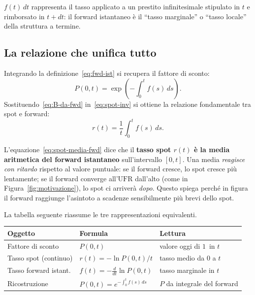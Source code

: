 \documentclass[11pt,a4paper]{article}
\theoremstyle{plain}
\theoremstyle{definition}
\theoremstyle{remark}
\newcommand{\UFR}{\ensuremath{\mathrm{UFR}}}
\begin{document}
$f(t)\,dt$ rappresenta il tasso applicato a un prestito infinitesimale stipulato in $t$
e rimborsato in $t+dt$: il forward istantaneo \`e il ``tasso marginale'' o ``tasso locale''
della struttura a termine.

\subsection{La relazione che unifica tutto}

Integrando la definizione~\eqref{eq:fwd-ist} si recupera il fattore di sconto:
\begin{equation}
  P(0,t) = \exp\!\left(-\int_0^t f(s)\,ds\right).
  \label{eq:B-da-fwd}
\end{equation}
Sostituendo~\eqref{eq:B-da-fwd} in~\eqref{eq:spot-inv} si ottiene la relazione
fondamentale tra spot e forward:
\begin{equation}
  r(t) = \frac{1}{t}\int_0^t f(s)\,ds.
  \label{eq:spot-media-fwd}
\end{equation}
\begin{keybox}
L'equazione~\eqref{eq:spot-media-fwd} dice che il \textbf{tasso spot $r(t)$ \`e la media
aritmetica del forward istantaneo} sull'intervallo $[0,t]$. Una media \emph{reagisce con
ritardo} rispetto al valore puntuale: se il forward cresce, lo spot cresce pi\`u lentamente;
se il forward converge all'$\UFR$ dall'alto (come in Figura~\ref{fig:motivazione}),
lo spot ci arriver\`a \emph{dopo}. Questo spiega perch\'e in figura il forward raggiunge
l'asintoto a scadenze sensibilmente pi\`u brevi dello spot.
\end{keybox}

\medskip
La tabella seguente riassume le tre rappresentazioni equivalenti.

\begin{center}
\renewcommand{\arraystretch}{1.4}
\begin{tabular}{lll}
\toprule
\textbf{Oggetto} & \textbf{Formula} & \textbf{Lettura} \\
\midrule
Fattore di sconto & $P(0,t)$ & valore oggi di $1$\,\texteuro{} in $t$ \\
Tasso spot (continuo) & $r(t) = -\ln P(0,t)/t$ & tasso medio da $0$ a $t$ \\
Tasso forward istant. & $f(t) = -\tfrac{d}{dt}\ln P(0,t)$ & tasso marginale in $t$ \\
Ricostruzione & $P(0,t) = e^{-\int_0^t f(s)\,ds}$ & $P$ da integrale del forward \\
\bottomrule
\end{tabular}
\end{center}
\end{document}
